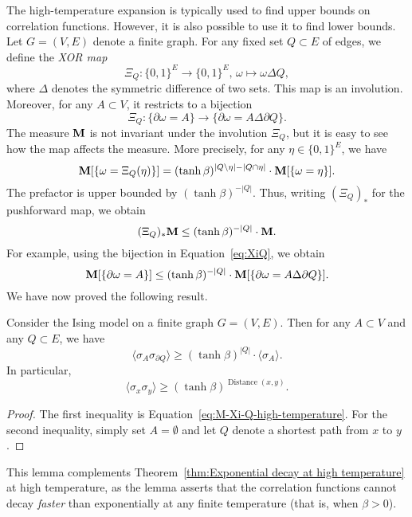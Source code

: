 The high-temperature expansion is typically used to find upper bounds on correlation
functions.
However, it is also possible to use it to find lower bounds.
Let $G=(V,E)$ denote a finite graph.
For any fixed set $Q\subset E$ of edges,
we define the \emph{XOR map}
\[
    \Xi_Q:\{0,1\}^E\to\{0,1\}^E,\,\omega\mapsto\omega\Delta Q,
\]
where $\Delta$ denotes the symmetric difference of two sets.
This map is an involution.
Moreover, for any $A\subset V$, it restricts to a bijection
\begin{equation}
    \label{eq:XiQ}
\Xi_Q:
\{\partial\omega=A\}\to\{\partial\omega=A\Delta\partial Q\}.
\end{equation}
The measure $\mathbf{M}$ is not invariant under the involution $\Xi_Q$,
but it is easy to see how the map affects the measure.
More precisely, for any $\eta\in\{0,1\}^E$, we have
\begin{equation}
    \label{eq:reweighting}
    \bfM[\{\omega = \Xi_Q(\eta)\}]
    =
    (\tanh\beta)^{|Q\setminus\eta|-|Q\cap\eta|}
    \cdot
    \bfM[\{\omega = \eta\}].
\end{equation}
The prefactor is upper bounded by $(\tanh\beta)^{-|Q|}$.
Thus, writing $(\Xi_Q)_*$ for the pushforward map,
we obtain
\[
    (\Xi_Q)_*\mathbf{M}\leq (\tanh\beta)^{-|Q|}
    \cdot
    \mathbf{M}.
\]
For example, using the bijection in Equation~\eqref{eq:XiQ},
we obtain
\begin{equation}
    \label{eq:M-Xi-Q-high-temperature}
    \bfM[\{\partial\omega=A\}]
    \leq
    (\tanh\beta)^{-|Q|}
    \cdot
    \bfM[\{\partial\omega=A\Delta\partial Q\}].
\end{equation}
We have now proved the following result.

\begin{lemma}
    \label{lemma:high-temperature}
    Consider the Ising model on a finite graph $G=(V,E)$.
    Then for any $A\subset V$ and any $Q\subset E$, we have
    \[
        \langle\sigma_A\sigma_{\partial Q}\rangle
        \geq
        (\tanh\beta)^{|Q|}\cdot\langle\sigma_A\rangle.
    \]
    In particular,
    \[
        \langle\sigma_x\sigma_y\rangle
        \geq
        (\tanh\beta)^{\operatorname{Distance}(x,y)}.
    \]
\end{lemma}

\begin{proof}
    The first inequality is Equation~\eqref{eq:M-Xi-Q-high-temperature}.
    For the second inequality, simply set $A=\emptyset$
    and let $Q$ denote a shortest path from $x$ to $y$.
\end{proof}

This lemma complements Theorem~\ref{thm:Exponential decay at high temperature}
at high temperature, as the lemma asserts that the correlation functions cannot
decay \emph{faster} than exponentially at any finite temperature
(that is, when $\beta>0$).

